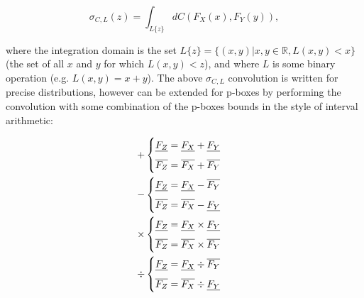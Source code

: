 \documentclass{juliacon}
\begin{document}
\begin{equation*}
  \sigma_{C,L}(z) = \int_{L\{z\}}dC(F_{X}(x),F_{Y}(y)) ,
\end{equation*}

where the integration domain is the set $L\{z\} = \{(x,y)| x,y \in \mathbb{R}, L(x,y) < x\}$ (the set of all $x$ and $y$ for which $L(x,y) < z$), and where $L$ is some binary operation (e.g. $L(x,y) = x+y$). The above $\sigma_{C,L}$ convolution is written for precise distributions, however can be extended for p-boxes by performing the convolution with some combination of the p-boxes bounds in the style of interval arithmetic:


\begin{eqnarray*}
  + 
  \begin{cases}
    \underline{F_Z} = \underline{F_X} + \underline{F_Y} \vspace{2mm}\\
    \overline{F_Z} = \overline{F_X} + \overline{F_Y}
  \end{cases}
  \\
  -\begin{cases}
    \underline{F_Z} = \underline{F_X} - \overline{F_Y}\vspace{2mm}\\
    \overline{F_Z} = \overline{F_X} - \underline{F_Y}
  \end{cases}
  \\
  \times
  \begin{cases}
    \underline{F_Z} = \underline{F_X} \times \underline{F_Y}\vspace{2mm}\\
    \overline{F_Z} = \overline{F_X} \times \overline{F_Y}
  \end{cases}
  \\
  \div
  \begin{cases}
    \underline{F_Z} = \underline{F_X} \div \overline{F_Y}\vspace{2mm}\\
    \overline{F_Z} = \overline{F_X} \div \underline{F_Y}
  \end{cases}
\end{eqnarray*}
\end{document}
